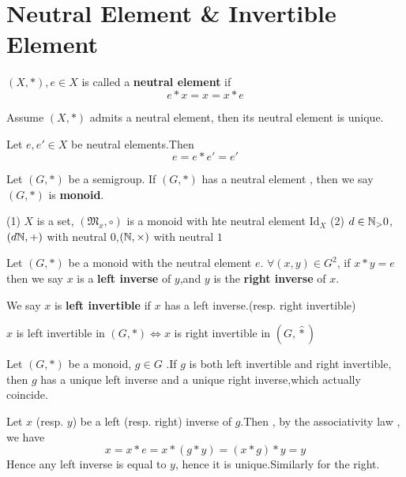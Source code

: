 \documentclass{book}
\numberwithin{equation}{section}
\begin{document}
\section{Neutral Element \& Invertible Element}
\begin{definitionenv}
    $(X,*),e\in X$ is called a \textbf{neutral element} if 
    $$e*x=x=x*e$$
\end{definitionenv}
\begin{propositionenv}
    Assume $(X,*)$ admits a neutral element, then its neutral element is unique.
\end{propositionenv}
\begin{proofenv}
    Let $e,e'\in X$ be neutral elements.Then 
    $$e=e*e'=e'$$
\end{proofenv}
\begin{definitionenv}
    Let $(G,*)$ be a semigroup. If $(G,*)$ has a neutral element , then we say $(G,*)$ is \textbf{monoid}.
\end{definitionenv}
\begin{exampleenv}
    \quad
    \newline
    (1) $X$ is a set, $(\mathfrak{M} _x,\circ)$ is a monoid with hte neutral element $\mathrm{Id}_X$
    \newline
    (2) $d\in \mathbb{N}_>0$,$(d\mathbb{N},+)$ with neutral $0$,$(\mathbb{N},\times)$ with neutral $1$
\end{exampleenv}
\begin{definitionenv}
    Let $(G,*)$ be a monoid with the neutral element $e$. $\forall (x,y)\in G^2$, if $x*y=e$ then we say $x$ is a \textbf{left inverse} of $y$,and $y$ is the \textbf{right inverse} of $x$.
\end{definitionenv}
\begin{remark}
    We say $x$ is \textbf{left invertible} if $x$ has a left inverse.(resp. right invertible)
\end{remark}
\begin{remark}
    $x$ is left invertible in $(G,*)\Leftrightarrow x $ is right invertible in $(G,\hat{*})$ 
\end{remark}
\begin{propositionenv}
    Let $(G,*)$ be a monoid, $g\in G$ .If $g$ is both left invertible and right invertible, then $g$ has a unique left inverse and a unique right inverse,which actually coincide.
\end{propositionenv}
\begin{proofenv}
    Let $x$ (resp. $y$) be a left (resp. right) inverse of $g$.Then , by the associativity law , we have 
    $$x=x*e=x*(g*y)=(x*g)*y=y$$
    Hence any left inverse is equal to $y$, hence it is unique.Similarly for the right.
\end{proofenv}
\end{document}
